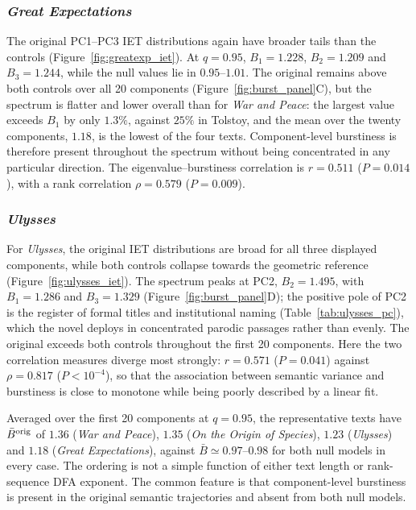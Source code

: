 \documentclass[preprint]{elsarticle}
\begin{document}
\subsubsection{\emph{Great Expectations}}

The original PC1--PC3 IET distributions again have broader tails than
the controls (Figure~\ref{fig:greatexp_iet}). At $q=0.95$,
$B_1=1.228$, $B_2=1.209$ and $B_3=1.244$, while the null values lie in
$0.95$--$1.01$. The original remains above both controls over all 20
components (Figure~\ref{fig:burst_panel}C), but the spectrum is flatter
and lower overall than for \emph{War and Peace}: the largest value
exceeds $B_1$ by only $1.3\%$, against $25\%$ in Tolstoy, and the mean
over the twenty components, $1.18$, is the lowest of the four texts.
Component-level burstiness is therefore present throughout the spectrum
without being concentrated in any particular direction. The
eigenvalue--burstiness correlation is $r=0.511$ ($P=0.014$), with a
rank correlation $\rho=0.579$ ($P=0.009$).



\subsubsection{\emph{Ulysses}}

For \emph{Ulysses}, the original IET distributions are broad for all
three displayed components, while both controls collapse towards the
geometric reference (Figure~\ref{fig:ulysses_iet}). The spectrum peaks
at PC2, $B_2=1.495$, with $B_1=1.286$ and $B_3=1.329$
(Figure~\ref{fig:burst_panel}D); the positive pole of PC2 is the
register of formal titles and institutional naming
(Table~\ref{tab:ulysses_pc}), which the novel deploys in concentrated
parodic passages rather than evenly. The original exceeds both controls
throughout the first 20 components. Here the two correlation measures
diverge most strongly: $r=0.571$ ($P=0.041$) against $\rho=0.817$
($P<10^{-4}$), so that the association between semantic variance and
burstiness is close to monotone while being poorly described by a
linear fit.

Averaged over the first 20 components at $q=0.95$, the representative
texts have $\bar B^{\rm orig}$ of $1.36$ (\emph{War and Peace}),
$1.35$ (\emph{On the Origin of Species}), $1.23$ (\emph{Ulysses}) and
$1.18$ (\emph{Great Expectations}), against $\bar B\simeq0.97$--$0.98$
for both null models in every case. The ordering is not a simple
function of either text length or rank-sequence DFA exponent.
The common feature is that component-level burstiness is present in the
original semantic trajectories and absent from both null models.
\end{document}
